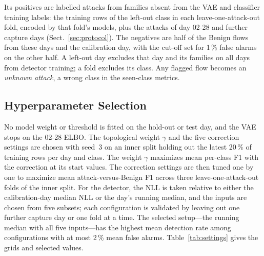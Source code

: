 \documentclass[runningheads,a4paper]{llncs}
\begin{document}
Its positives are labelled attacks from families absent from the VAE and classifier training labels: the training rows of the left-out class in each leave-one-attack-out fold, encoded by that fold's models, plus the attacks of day 02-28 and further capture days (Sect.~\ref{sec:protocol}). The negatives are half of the Benign flows from these days and the calibration day, with the cut-off set for 1\,\% false alarms on the other half. A left-out day excludes that day and its families on all days from detector training; a fold excludes its class. Any flagged flow becomes an \emph{unknown attack}, a wrong class in the seen-class metrics.

\subsection{Hyperparameter Selection}\label{sec:selection}

No model weight or threshold is fitted on the hold-out or test day, and the VAE stops on the 02-28 ELBO. The topological weight $\gamma$ and the five correction settings are chosen with seed~3 on an inner split holding out the latest 20\,\% of training rows per day and class. The weight $\gamma$ maximizes mean per-class F1 with the correction at its start values. The correction settings are then tuned one by one to maximize mean attack-versus-Benign F1 across three leave-one-attack-out folds of the inner split. For the detector, the NLL is taken relative to either the calibration-day median NLL or the day's running median, and the inputs are chosen from five subsets; each configuration is validated by leaving out one further capture day or one fold at a time. The selected setup---the running median with all five inputs---has the highest mean detection rate among configurations with at most 2\,\% mean false alarms. Table~\ref{tab:settings} gives the grids and selected values.
\end{document}
